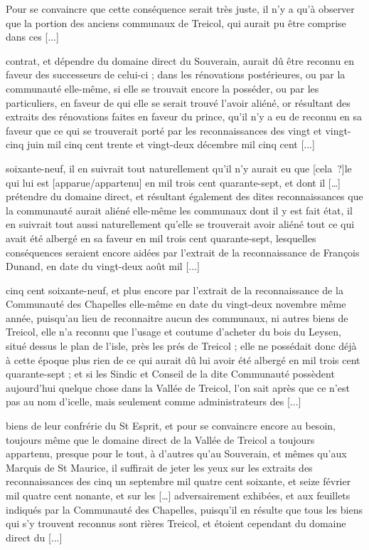 \documentclass[a4paper,twoside,openany]{article}
\begin{document}
Pour se convaincre que cette conséquence serait très juste, il n'y a qu'à observer que la portion des anciens communaux de Treicol, qui aurait pu être comprise dans ces [...]


contrat, et dépendre du domaine direct du Souverain, aurait dû être reconnu en faveur des successeurs de celui-ci ; dans les rénovations postérieures, ou par la communauté elle-même, si elle se trouvait encore la posséder, ou par les particuliers, en faveur de qui elle se serait trouvé l'avoir aliéné, or résultant des extraits des rénovations faites en faveur du prince, qu'il n'y a eu de reconnu en sa faveur que ce qui se trouverait porté par les reconnaissances des vingt et vingt-cinq juin mil cinq cent trente et vingt-deux décembre mil cinq cent [...]

 soixante-neuf, il en suivrait tout naturellement qu'il n'y aurait eu que [cela~?]le qui lui est [apparue/appartenu] en mil trois cent quarante-sept, et dont il […] prétendre du domaine direct, et résultant également des dites reconnaissances que la communauté aurait aliéné elle-même les communaux dont il y est fait état, il en suivrait tout aussi naturellement qu'elle se trouverait avoir aliéné tout ce qui avait été albergé en sa faveur en mil trois cent quarante-sept, lesquelles conséquences seraient encore aidées par l'extrait de la reconnaissance de François Dunand, en date du vingt-deux août mil [...]


cinq cent soixante-neuf, et plus encore par l'extrait de la reconnaissance de la Communauté des Chapelles elle-même en date du vingt-deux novembre même année, puisqu'au lieu de reconnaitre aucun des communaux, ni autres biens de Treicol, elle n'a reconnu que l'usage et coutume d'acheter du bois du Leysen, situé dessus le plan de l'isle, près les prés de Treicol ; elle ne possédait donc déjà à cette époque plus rien de ce qui aurait dû lui avoir été albergé en mil trois cent quarante-sept ; et si les Sindic et Conseil de la dite Communauté possèdent aujourd'hui quelque chose dans la Vallée de Treicol, l'on sait après que ce n'est pas au nom d'icelle, mais seulement comme administrateurs des [...]

biens de leur confrérie du St Esprit, et pour se convaincre encore au besoin, toujours même que le domaine direct de la Vallée de Treicol a toujours appartenu, presque pour le tout, à d'autres qu'au Souverain, et mêmes qu'aux Marquis de St Maurice, il suffirait de jeter les yeux sur les extraits des reconnaissances des cinq un septembre mil quatre cent soixante, et seize février mil quatre cent nonante, et sur les […] adversairement exhibées, et aux feuillets indiqués par la Communauté des Chapelles, puisqu'il en résulte que tous les biens qui s'y trouvent reconnus sont rières Treicol, et étoient cependant du domaine direct du [...]
\end{document}

